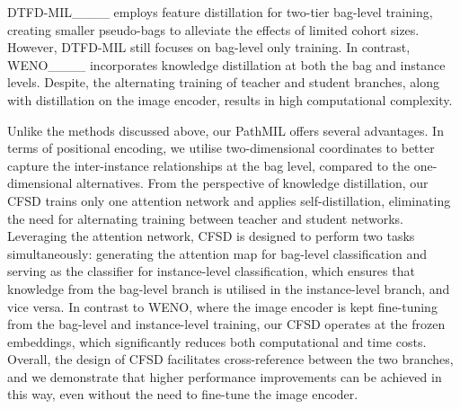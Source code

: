 DTFD-MIL____ employs feature distillation for two-tier bag-level training, creating smaller pseudo-bags to alleviate the effects of limited cohort sizes. However, DTFD-MIL still focuses on bag-level only training. In contrast, WENO____ incorporates knowledge distillation at both the bag and instance levels. Despite, the alternating training of teacher and student branches, along with distillation on the image encoder, results in high computational complexity.

Unlike the methods discussed above, our PathMIL offers several advantages. In terms of positional encoding, we utilise two-dimensional coordinates to better capture the inter-instance relationships at the bag level, compared to the one-dimensional alternatives. From the perspective of knowledge distillation, our CFSD trains only one attention network and applies self-distillation, eliminating the need for alternating training between teacher and student networks. Leveraging the attention network, CFSD is designed to perform two tasks simultaneously: generating the attention map for bag-level classification and serving as the classifier for instance-level classification, which ensures that knowledge from the bag-level branch is utilised in the instance-level branch, and vice versa. In contrast to WENO, where the image encoder is kept fine-tuning from the bag-level and instance-level training, our CFSD operates at the frozen embeddings, which significantly reduces both computational and time costs. Overall, the design of CFSD facilitates cross-reference between the two branches, and we demonstrate that higher performance improvements can be achieved in this way, even without the need to fine-tune the image encoder.


